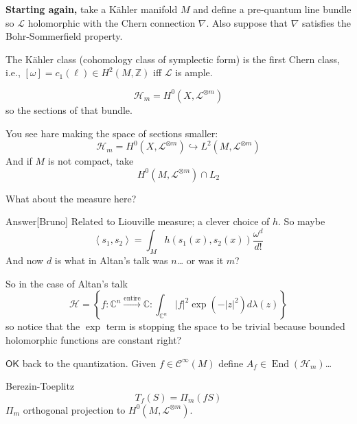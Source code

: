 {\color{3}\bfseries Starting again,}\hspace{.5em} take a Kähler manifold $M$ and define a pre-quantum line bundle so  $\mathcal{L}$ holomorphic with the Chern connection $\nabla$. Also suppose that $\nabla$ satisfies the Bohr-Sommerfield property.

\begin{remark}\leavevmode
	The Kähler class (cohomology class of symplectic form) is the first Chern class, i.e., $[\omega]=c_1(\ell)\in H^{2}(M,\mathbb{Z})$ iff $\mathcal{L}$ is ample.
\end{remark}

\begin{defn}\leavevmode
	\[\mathcal{H}_m=H^{0}(X,\mathcal{L}^{\otimes m})\]
	so the sections of that bundle.
\end{defn}

You see hare making the space of sections smaller:
	\[\mathcal{H}_m=H^{0}(X,\mathcal{L}^{\otimes m})\hookrightarrow L^2(M,\mathcal{L}^{\otimes m})\]
And if $M$ is not compact, take
\[H^{0}(M,\mathcal{L}^{\otimes m})\cap L_2\]

\begin{question}[Altan]\leavevmode
	What about the measure here?
\end{question}

\begin{thing9}{Answer}[Bruno]\leavevmode
	Related to Liouville measure; a clever choice of $h$. So maybe
	 \[\left<s_1,s_2\right> =\int_{M}h\left( s_1(x),s_2(x) \right) \frac{\omega^d}{d!}\]
	 And now $d$ is what in Altan's talk was  $n$… or was it $m$?
\end{thing9}

\begin{remark}\leavevmode
	So in the case of Altan's talk
	\[\mathcal{H}=\left\{ f:\mathbb{C}^{n}\overset{\operatorname{entire}}{\longrightarrow}\mathbb{C}:\int_{\mathbb{C}^{n}}|f|^2\operatorname{exp}(-|z|^2) d \lambda(z) \right\} \]
	so notice that the $\operatorname{exp}$ term is stopping the space to be trivial because bounded holomorphic functions are constant right?
\end{remark}

$\mathsf{OK}$ back to the quantization. Given $f \in\mathcal{C}^\infty(M)$ define $A_f \in\operatorname{End}(\mathcal{H}_m)$…

\begin{thing4}{Berezin-Toeplitz}\leavevmode
\[T_f(S)=\Pi_m(fS) \]
$\Pi_m$ orthogonal projection to $H^{0}(M,\mathcal{L}^{\otimes m})$.
\end{thing4}

